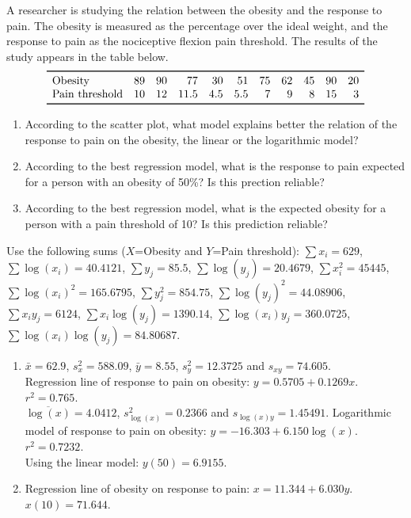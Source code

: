 {A researcher is studying the relation between the obesity and the response to pain.
The obesity is measured as the percentage over the ideal weight, and the response to pain as the nociceptive flexion pain threshold.
The results of the study appears in the table below.
\[
\begin{array}{lrrrrrrrrrr}
\toprule
\mbox{Obesity} & 89 & 90 & 77 & 30 & 51 & 75 & 62 & 45 & 90 & 20\\
\mbox{Pain threshold} & 10 & 12 & 11.5 & 4.5 & 5.5 & 7 & 9 & 8 & 15 & 3\\
\bottomrule
\end{array}
\]
\begin{enumerate}
\item According to the scatter plot, what model explains better the relation of the response to pain on the obesity, the linear or the logarithmic model?
\item According to the best regression model, what is the response to pain expected for a person with an obesity of 50\%?
Is this prection reliable?
\item According to the best regression model, what is the expected obesity for a person with a pain threshold of
10? Is this prediction reliable?
\end{enumerate}
Use the following sums ($X$=Obesity and $Y$=Pain threshold): $\sum x_i=629$, $\sum \log(x_i)=40.4121$, $\sum y_j=85.5$,
$\sum \log(y_j)=20.4679$, $\sum x_i^2=45445$, $\sum \log(x_i)^2=165.6795$, $\sum y_j^2=854.75$, $\sum\log(y_j)^2=44.08906$, $\sum x_iy_j=6124$, $\sum x_i\log(y_j)=1390.14$, $\sum \log(x_i)y_j=360.0725$, $\sum\log(x_i)\log(y_j)=84.80687$.
}
{
\begin{enumerate}[start=2]
\item $\bar{x}=62.9$, $s_x^2=588.09$, $\bar{y}=8.55$, $s_y^2=12.3725$ and $s_{xy}=74.605$.\\
Regression line of response to pain on obesity: $y=0.5705+0.1269x$. $r^2=0.765$.\\
$\overline{\log(x)}=4.0412$, $s_{\log(x)}^2=0.2366$ and $s_{\log(x)y}=1.45491$.
Logarithmic model of response to pain on obesity: $y=-16.303+6.150\log(x)$.
$r^2=0.7232$.\\
Using the linear model: $y(50)=6.9155$.
\item Regression line of obesity on response to pain: $x=11.344+6.030y$.\\
$x(10)=71.644$.
\end{enumerate}
}
{
}


